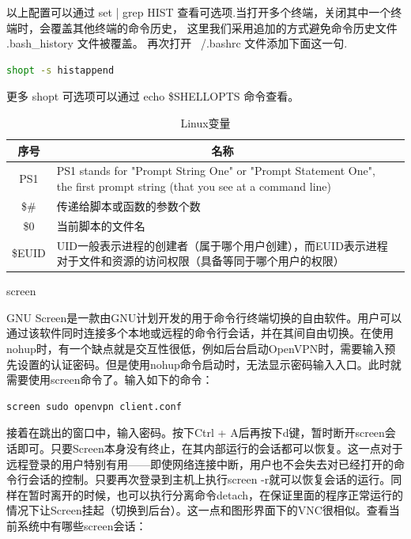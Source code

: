 \documentclass[12pt]{book}
\makeatletter
\numberwithin{dummy}{section}
\theoremstyle{ocrenumbox}
\theoremstyle{blacknumex}
\theoremstyle{blacknumbox}
\theoremstyle{ocrenum}
\renewcommand{\subsubsection}{\@startsection {subsubsection}{3}{\z@}
	{-2ex \@plus -0.1ex \@minus -.2ex}
	{.2ex \@plus.2ex }
	{\normalfont\small\sffamily\bfseries}}
\makeatother
\begin{document}
以上配置可以通过 set | grep HIST 查看可选项.当打开多个终端，关闭其中一个终端时，会覆盖其他终端的命令历史， 这里我们采用追加的方式避免命令历史文件 .bash\_history 文件被覆盖。 再次打开 ~/.bashrc 文件添加下面这一句.

\begin{lstlisting}[language=Bash]
shopt -s histappend
\end{lstlisting}

更多 shopt 可选项可以通过 echo \$SHELLOPTS 命令查看。

\begin{table}
	\caption{Linux变量}
	\label{table:linuxenvironmentvariable}
	\begin{center}
	\begin{tabular}{cp{10cm}c}
		\hline
		\multirow{1}{*}{序号}
		& \multicolumn{1}{c}{名称}  \\
		\hline			
		PS1  & PS1 stands for "Prompt String One" or "Prompt Statement One", the first prompt string (that you see at a command line) \\
		\$\# & 传递给脚本或函数的参数个数 \\
		\$0 & 当前脚本的文件名 \\
		\$EUID & UID一般表示进程的创建者（属于哪个用户创建），而EUID表示进程对于文件和资源的访问权限（具备等同于哪个用户的权限） \\
		\hline
	\end{tabular}	
	\end{center}
\end{table}

\subsubsection{screen}

GNU Screen是一款由GNU计划开发的用于命令行终端切换的自由软件。用户可以通过该软件同时连接多个本地或远程的命令行会话，并在其间自由切换。在使用nohup时，有一个缺点就是交互性很低，例如后台启动OpenVPN时，需要输入预先设置的认证密码。但是使用nohup命令启动时，无法显示密码输入入口。此时就需要使用screen命令了。输入如下的命令：

\begin{lstlisting}[language=Bash]
screen sudo openvpn client.conf
\end{lstlisting}

接着在跳出的窗口中，输入密码。按下Ctrl + A后再按下d键，暂时断开screen会话即可。只要Screen本身没有终止，在其内部运行的会话都可以恢复。这一点对于远程登录的用户特别有用——即使网络连接中断，用户也不会失去对已经打开的命令行会话的控制。只要再次登录到主机上执行screen -r就可以恢复会话的运行。同样在暂时离开的时候，也可以执行分离命令detach，在保证里面的程序正常运行的情况下让Screen挂起（切换到后台）。这一点和图形界面下的VNC很相似。查看当前系统中有哪些screen会话：
\end{document}
